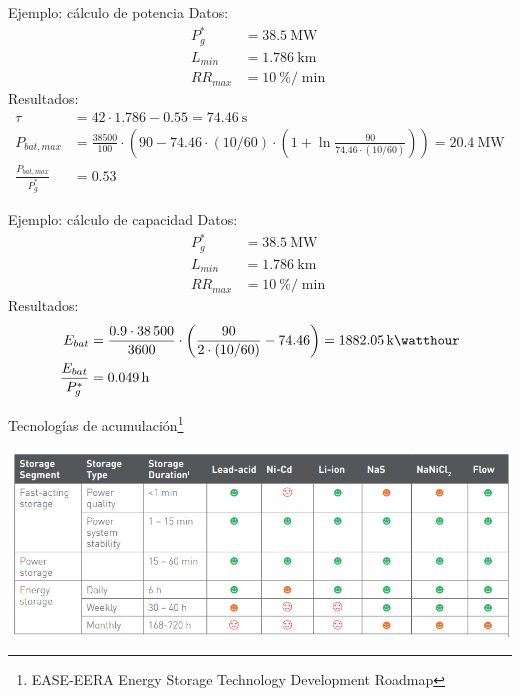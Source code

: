 \documentclass[aspectratio=169, usenames,svgnames,dvipsnames]{beamer}
\begin{document}
\begin{frame}[label={sec:orgf3b9658}]{Ejemplo: cálculo de potencia}
Datos:
\begin{align*}
  P_g^* &= \qty{38.5}{\mega\watt}\\
  L_{min} &= \qty{1.786}{\kilo\meter}\\
  RR_{max} &= \qty{10}{\%\per\min}
\end{align*}
Resultados:
\begin{align*}
  \tau &= 42 \cdot \num{1.786} - \num{0.55} = \qty{74.46}{\second}\\
  P_{bat,max} &= \frac{\num{38500}}{100} \cdot \left(90 - \num{74.46} \cdot (10/60) \cdot \left( 1 + \ln\frac{90}{\num{74.46} \cdot (10/60)}\right) \right) = \qty{20.4}{\mega\watt}\\
  \frac{P_{bat,max}}{P_g^*} &= \num{0.53}
\end{align*}
\end{frame}

\begin{frame}[label={sec:org5c021fc}]{Ejemplo: cálculo de capacidad}
Datos:
\begin{align*}
  P_g^* &= \qty{38.5}{\mega\watt}\\
  L_{min} &= \qty{1.786}{\kilo\meter}\\
  RR_{max} &= \qty{10}{\%\per\min}
\end{align*}
Resultados:
\begin{align*}
  E_{bat} &= \frac{\num{0.9} \cdot \num{38500}}{\num{3600}} \cdot \left( \frac{90}{2 \cdot (10/60)} - \num{74.46} \right) = \qty{1882.05}{\kilo\watthour}\\
  \frac{E_{bat}}{P_g^*} &= \qty{0.049}{\hour} 
\end{align*}
\end{frame}

\begin{frame}[label={sec:orgbcac081}]{Tecnologías de acumulación\footnote{EASE-EERA Energy Storage Technology Development Roadmap}}
\begin{center}
\includegraphics[width=\textwidth]{../figs/ComparativaTecnologiasAcumulacion.png}
\end{center}
\end{frame}
\end{document}
